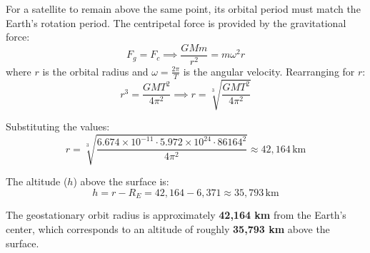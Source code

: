 \documentclass[a4paper,12pt]{letter}
\begin{document}
\begin{enumerate}
For a satellite to remain above the same point, its orbital period must match the Earth's rotation period. The centripetal force is provided by the gravitational force:
\begin{equation}
    F_g = F_c \implies \frac{G M m}{r^2} = m \omega^2 r
\end{equation}
where $r$ is the orbital radius and $\omega = \frac{2\pi}{T}$ is the angular velocity. 
Rearranging for $r$:
\begin{equation}
    r^3 = \frac{G M T^2}{4\pi^2} \implies r = \sqrt[3]{\frac{G M T^2}{4\pi^2}}
\end{equation}

Substituting the values:
\begin{equation}
    r = \sqrt[3]{\frac{6.674 \times 10^{-11} \cdot 5.972 \times 10^{24} \cdot 86164^2}{4\pi^2}} \approx 42,164 \, \text{km}
\end{equation}

The altitude ($h$) above the surface is:
\begin{equation}
    h = r - R_E = 42,164 - 6,371 \approx 35,793 \, \text{km}
\end{equation}

\begin{center}
\end{center}

The geostationary orbit radius is approximately \textbf{42,164 km} from the Earth's center, which corresponds to an altitude of roughly \textbf{35,793 km} above the surface.



\end{enumerate}
\end{document}
